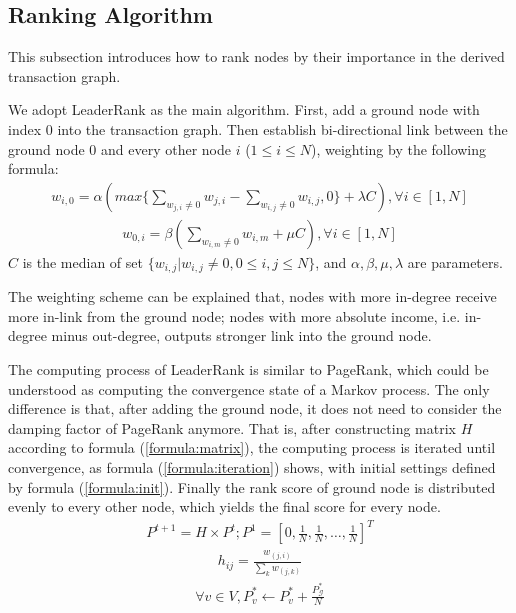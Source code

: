 \subsection{Ranking Algorithm} \label{subsec:leaderrank}
This subsection introduces how to rank nodes by their importance in the derived transaction graph.

We adopt LeaderRank\cite{Chen2013}\cite{Li2014} as the main algorithm. First, add a ground node with index $0$ into the transaction graph. Then establish bi-directional link between the ground node $0$ and every other node $i$ ($1 \leq i \leq N$), weighting by the following formula:
\begin{align}\label{formula:weight1}
w_{i,0} = \alpha( max\{ \sum_{w_{j,i} \neq 0} w_{j,i} - \sum_{w_{i,j} \neq 0} w_{i,j} , 0\} + \lambda C ), \forall i \in [1,N]
\end{align}
\begin{align}\label{formula:weight2}
w_{0,i}	= \beta ( \sum_{w_{i,m} \neq 0} w_{i,m} + \mu C), \forall i \in [1,N]
\end{align}
$C$ is the median of set $\{w_{i,j} | w_{i,j} \neq 0, 0\leq i,j \leq N\}$, and $\alpha, \beta, \mu, \lambda$ are parameters.

The weighting scheme can be explained that, nodes with more in-degree receive more in-link from the ground node; nodes with more absolute income, i.e. in-degree minus out-degree, outputs stronger link into the ground node.

The computing process of LeaderRank is similar to PageRank, which could be understood as computing the convergence state of a Markov process. The only difference is that, after adding the ground node, it does not need to consider the damping factor of PageRank\cite{Brin2010}\cite{page1999pagerank} anymore. That is, after constructing matrix $H$ according to formula (\ref{formula:matrix}), the computing process is iterated until convergence, as formula (\ref{formula:iteration}) shows, with initial settings defined by formula (\ref{formula:init}). Finally the rank score of ground node is distributed evenly to every other node, which yields the final score for every node.
\begin{align} \label{formula:iteration}
	P^{t+1} = H \times P^{t}; P^1=[0, \frac{1}{N}, \frac{1}{N}, \dots, \frac{1}{N}]^T
\end{align}
\begin{align} \label{formula:matrix}
	h_{ij} = \frac{w_{(j,i)}}{\sum_k w_{(j,k)}}
\end{align}
\begin{align} \label{formula:init}
\forall v \in V, P^*_v \leftarrow P^*_v + \frac{P^*_{\mathcal{G}}}{N}
\end{align}

